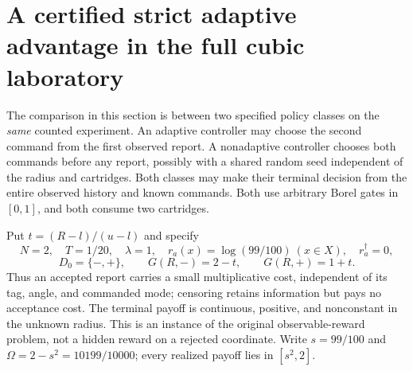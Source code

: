 \section{A certified strict adaptive advantage in the full cubic laboratory}\label{sec:advantage}
The comparison in this section is between two specified policy classes on
the \emph{same} counted experiment. An adaptive controller may choose the
second command from the first observed report. A nonadaptive controller
chooses both commands before any report, possibly with a shared random
seed independent of the radius and cartridges. Both classes may make their
terminal decision from the entire observed history and known commands.
Both use arbitrary Borel gates in $[0,1]$, and both consume two cartridges.

Put $t=(R-l)/(u-l)$ and specify
\begin{equation}
 N=2,\quad T=1/20,\quad\lambda=1,\quad
 r_a(x)=\log(99/100)\ (x\in X),\quad r_a^\dagger=0,
 \label{eq:advantage-reward}
\end{equation}
\[
 D_0=\{-,+\},\qquad G(R,-)=2-t,\qquad G(R,+)=1+t.
\]
Thus an accepted report carries a small multiplicative cost, independent
of its tag, angle, and commanded mode; censoring retains information but
pays no acceptance cost. The terminal payoff is continuous, positive, and
nonconstant in the unknown radius. This is an instance of the original
observable-reward problem, not a hidden reward on a rejected coordinate.
Write $s=99/100$ and $\Omega=2-s^2=10199/10000$; every realized payoff lies
in $[s^2,2]$.

